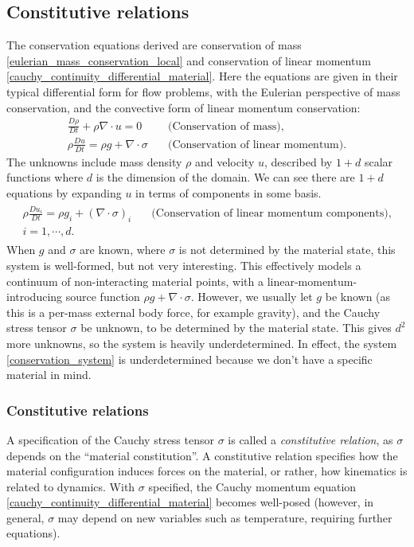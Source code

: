 \subsection{Constitutive relations}\label{constitutive_relations}
The conservation equations derived are conservation of mass \eqref{eulerian_mass_conservation_local} and conservation of linear momentum \eqref{cauchy_continuity_differential_material}.
Here the equations are given in their typical differential form for flow problems, with the Eulerian perspective of mass conservation, and the
convective form of linear momentum conservation:
\begin{equation}\label{conservation_system}
\begin{split}
    \frac{D\rho}{Dt} + \rho\nabla\cdot u = 0 &\quad\text{(Conservation of mass)},
    \\
    \rho\frac{Du}{Dt} = \rho g + \nabla\cdot\sigma &\quad\text{(Conservation of linear momentum)}.
\end{split}
\end{equation}
The unknowns include mass density $\rho$ and velocity $u$, described by $1 + d$ scalar functions where $d$ is the dimension of the domain.
We can see there are $1 + d$ equations by expanding $u$ in terms of components in some basis.
\begin{align*}
\begin{split}
    \rho\frac{Du_i}{Dt} = \rho g_i + \left(\nabla\cdot\sigma\right)_i &\quad\text{(Conservation of linear momentum components)},
    \\
    i=1,\cdots,d. &
\end{split}
\end{align*}
When $g$ and $\sigma$ are known, where $\sigma$ is not determined by the material state, this system is well-formed, but not very interesting.
This effectively models a continuum of non-interacting material points, with a linear-momentum-introducing source function $\rho g + \nabla\cdot \sigma$.
However, we usually let $g$ be known (as this is a per-mass external body force, for example gravity), and the Cauchy stress tensor $\sigma$ be unknown,
to be determined by the material state.
This gives $d^2$ more unknowns, so the system is heavily underdetermined. In effect, the system \eqref{conservation_system} is
underdetermined because we don't have a specific material in mind.

\subsubsection{Constitutive relations}
A specification of the Cauchy stress tensor $\sigma$ is called a \textit{constitutive relation},
as $\sigma$ depends on the ``material constitution''.
A constitutive relation specifies how the material configuration
induces forces on the material, or rather, how kinematics is related to dynamics. With $\sigma$ specified, the Cauchy momentum equation \eqref{cauchy_continuity_differential_material} becomes well-posed
(however, in general, $\sigma$ may depend on new variables such as temperature, requiring further equations).

